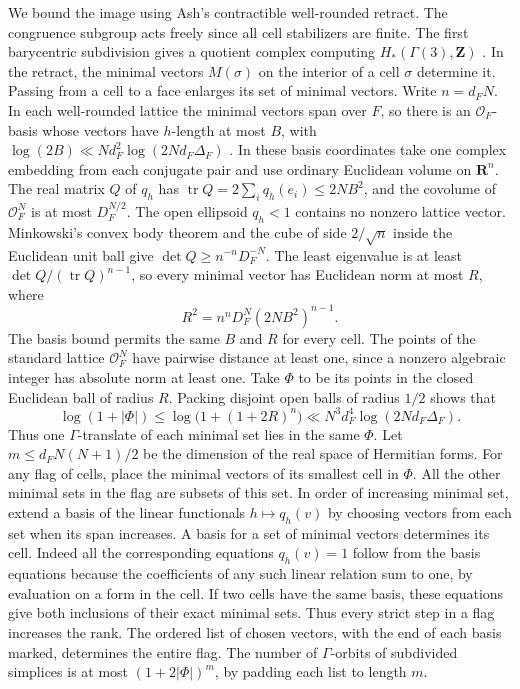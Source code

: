 We bound the image using Ash's contractible well-rounded retract.
The congruence subgroup acts freely since all cell stabilizers are
finite. The first barycentric subdivision gives a quotient complex
computing \(H_*(\Gamma(3),\mathbf Z)\)
\cite[\S2.3]{f1bayer-fluckiger-emery-houriet}
\cite[\S4.3]{f1ash-mcconnell-retract}.
In the retract, the minimal vectors \(M(\sigma)\) on the interior
of a cell \(\sigma\) determine it. Passing from a cell to a face
enlarges its set of minimal vectors. Write \(n=d_FN\). In each
well-rounded lattice the minimal vectors span over \(F\), so there
is an \(\mathcal O_F\)-basis whose vectors have \(h\)-length at most \(B\), with
\(\log(2B)\ll Nd_F^2\log(2Nd_F\Delta_F)\)
\cite[Proposition~4.7]{f1bayer-fluckiger-emery-houriet}.
In these basis coordinates take one complex embedding from each
conjugate pair and use ordinary Euclidean volume on \(\mathbf R^n\).
The real matrix \(Q\) of \(q_h\) has
\(\operatorname{tr} Q=2\sum_i q_h(e_i)\le2NB^2\), and the covolume
of \(\mathcal O_F^N\) is at most \(D_F^{N/2}\).
The open ellipsoid \(q_h<1\) contains no nonzero lattice vector.
Minkowski's convex body theorem and the cube of side \(2/\sqrt n\)
inside the Euclidean unit ball give
\(\det Q\ge n^{-n}D_F^{-N}\). The least eigenvalue is at least
\(\det Q/(\operatorname{tr} Q)^{n-1}\), so every minimal vector has
Euclidean norm at most \(R\), where
\[
 R^2=n^n D_F^N (2NB^2)^{n-1}.
\]
The basis bound permits the same \(B\) and \(R\) for every cell.
The points of the standard lattice \(\mathcal O_F^N\) have pairwise
distance at least one, since a nonzero algebraic integer has
absolute norm at least one. Take \(\Phi\) to be its points in the
closed Euclidean ball of radius \(R\). Packing disjoint open balls
of radius \(1/2\) shows that
\[
 \log(1+|\Phi|)\le \log\bigl(1+(1+2R)^n\bigr)
 \ll N^3d_F^4\log(2Nd_F\Delta_F).
\]
Thus one \(\Gamma\)-translate of each minimal set lies in the same
\(\Phi\).
Let \(m\le d_FN(N+1)/2\) be the dimension of the real space of
Hermitian forms. For any flag of cells, place the minimal vectors of
its smallest cell in \(\Phi\). All the other minimal sets in the
flag are subsets of this set. In order of increasing minimal set,
extend a basis of the linear functionals \(h\mapsto q_h(v)\) by
choosing vectors from each set when its span increases. A basis for
a set of minimal vectors determines its cell. Indeed all the
corresponding equations \(q_h(v)=1\) follow from the basis
equations because the coefficients of any such linear relation
sum to one, by evaluation on a form in the cell. If two cells
have the same basis, these equations give both inclusions of
their exact minimal sets. Thus every strict step in a flag
increases the rank. The ordered list of chosen vectors, with
the end of each basis marked, determines the entire flag.
The number of \(\Gamma\)-orbits of subdivided simplices is at most
\((1+2|\Phi|)^m\), by padding each list to length \(m\).

